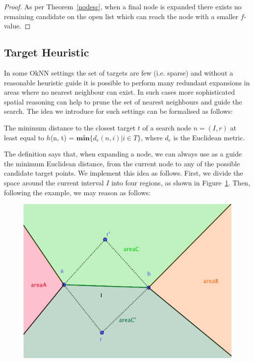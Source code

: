 \begin{proof}
  As per Theorem~\ref{nodesc}, when a final node is expanded there exists
  no remaining candidate on the open list which can reach the node with a smaller $f$-value.
\end{proof}

\subsection{Target Heuristic} 
\label{theuristic}
In some OkNN settings the set of targets are few (i.e. sparse) and without a reasonable 
heuristic guide it is possible to perform many redundant expansions in areas where no nearest
neighbour can exist. In such cases more sophisticated spatial reasoning can help to prune the
set of nearest neighbours and guide the search. The idea we introduce for such settings can
be formalised as follows:


\begin{definition}\label{close}
  The minimum distance to the closest target $t$ of a search node $n=(I, r)$ at least equal to 
  $h$(n, t) =  $\mathbf{min}\{d_e(n, i) | i \in T\}$, where $d_e$ is the Euclidean metric.
\end{definition}

The definition says that, when expanding a node, we can always use as a guide the minimum Euclidean distance, from the current node to any of the possible candidate target points. 
We implement this idea as follows. 
First, we divide the space around the current interval $I$ into four regions, as shown in Figure~\ref{fa}.
Then, following the example, we may reason as follows:
\begin{figure}[ht]
  \centering
  \includegraphics[width=\linewidth]{pic/heuristic.png}
  \caption{}
  \label{fa}
\end{figure}


